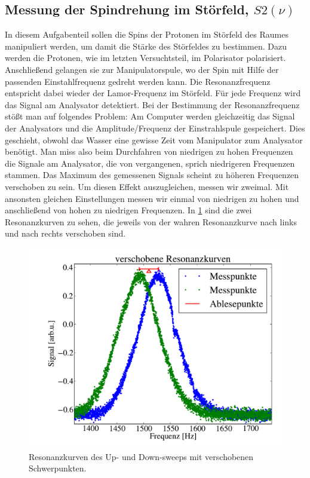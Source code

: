 \documentclass[paper=a4,
	fontsize=10pt,
	DIV=18,
	twocolumn,
	parskip=half
	]{scrartcl}
\numberwithin{equation}{section}    %
\begin{document}
\subsection{Messung der Spindrehung im Störfeld, $S2(\nu)$}
\label{auswertung5}
In diesem Aufgabenteil sollen die Spins der Protonen im Störfeld des Raumes manipuliert werden, um damit die Stärke des Störfeldes zu bestimmen.
Dazu werden die Protonen, wie im letzten Versuchtsteil, im Polarisator polarisiert.
Anschließend gelangen sie zur Manipulatorspule, wo der Spin mit Hilfe der passenden Einstahlfrequenz gedreht werden kann.
Die Resonanzfrequenz entspricht dabei wieder der Lamor-Frequenz im Störfeld.
Für jede Frequenz wird das Signal am Analysator detektiert.
Bei der Bestimmung der Resonanzfrequenz stößt man auf folgendes Problem:
Am Computer werden gleichzeitig das Signal der Analysators und die Amplitude/Frequenz der Einstrahlspule gespeichert.
Dies geschieht, obwohl das Wasser eine gewisse Zeit vom Manipulator zum Analysator benötigt.
Man miss also beim Durchfahren von niedrigen zu hohen Frequenzen die Signale am Analysator, die von vergangenen, sprich niedrigeren Frequenzen stammen.
Das Maximum des gemessenen Signals scheint zu höheren Frequenzen verschoben zu sein.
Um diesen Effekt auszugleichen, messen wir zweimal. 
Mit ansonsten gleichen Einstellungen messen wir einmal von niedrigen zu hohen und anschließend von hohen zu niedrigen Frequenzen.
In \cref{gewichte} sind die zwei Resonanzkurven zu sehen, die jeweils von der wahren Resonanzkurve nach links und nach rechts verschoben sind.
\begin{figure}[htp]
	\begin{center}
		\includegraphics[width=\columnwidth]{Data-Plots/05-Resonanzfrequenz.pdf}
		\caption{Resonanzkurven des Up- und Down-sweeps mit verschobenen Schwerpunkten.}
		\label{gewichte}
	\end{center}
\end{figure}
\end{document}

